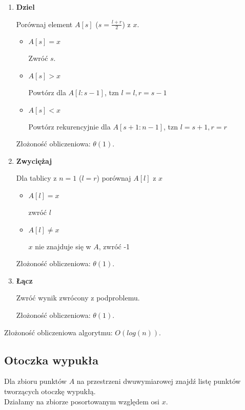 \documentclass[main.tex]{subfiles}
\begin{document}
    \begin{enumerate}
        \item \textbf{Dziel}

        Porównaj element $A[s]$ ($s = \frac{l+ r}{2}$) z $x$.

        \begin{itemize}
            \item $A[s] = x$

            Zwróć $s$.

            \item $A[s] > x$

            Powtórz dla $A[l : s - 1]$, tzn $l = l, r = s - 1$

            \item $A[s] < x$

            Powtórz rekurencyjnie dla $A[s + 1 : n - 1]$, tzn $l = s + 1, r = r$
        \end{itemize}

        Złożoność obliczeniowa: $\theta(1)$.

        \item \textbf{Zwyciężaj}

        Dla tablicy z $n = 1$ ($l = r$) porównaj $A[l]$ z $x$

        \begin{itemize}
            \item $A[l] = x$

            zwróć $l$
            \item $A[l] \neq x$

            $x$ nie znajduje się w $A$, zwróć -1
        \end{itemize}

        Złożoność obliczeniowa: $\theta(1)$.

        \item \textbf{Łącz}

        Zwróć wynik zwrócony z podproblemu.

        Złożoność obliczeniowa: $\theta(1)$.
    \end{enumerate}

    Złożoność obliczeniowa algorytmu: $O(log(n))$.

    \subsection{Otoczka wypukła}

    Dla zbioru punktów $A$ na przestrzeni dwuwymiarowej znajdź listę punktów tworzących
    otoczkę wypukłą.
    \[\]
    Działamy na zbiorze posortowanym względem osi $x$.
\end{document}
